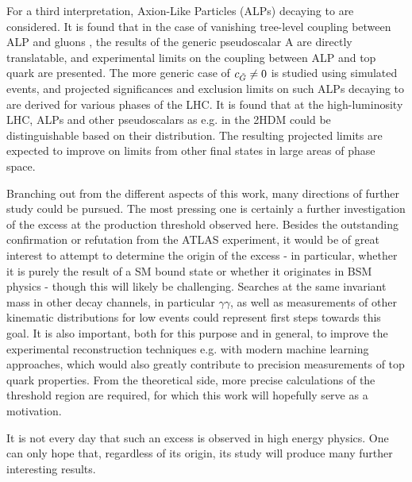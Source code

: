 For a third interpretation, Axion-Like Particles (ALPs) decaying to \ttbar are considered. It is found that in the case of vanishing tree-level coupling between ALP and gluons \cG, the results of the generic pseudoscalar A are directly translatable, and experimental limits on the coupling between ALP and top quark are presented. The more generic case of $c_{\tilde{G}} \neq 0$ is studied using simulated events, and projected significances and exclusion limits on such ALPs decaying to \ttbar are derived for various phases of the LHC. It is found that at the high-luminosity LHC, ALPs and other pseudoscalars as e.g. in the 2HDM could be distinguishable based on their \mtt distribution. The resulting projected limits are expected to improve on limits from other final states in large areas of phase space.

\smallskip

Branching out from the different aspects of this work, many directions of further study could be pursued. The most pressing one is certainly a further investigation of the excess at the \ttbar production threshold observed here. Besides the outstanding confirmation or refutation from the ATLAS experiment, it would be of great interest to attempt to determine the origin of the excess - in particular, whether it is purely the result of a SM bound state or whether it originates in BSM physics - though this will likely be challenging. Searches at the same invariant mass in other decay channels, in particular $\gamma\gamma$, as well as measurements of other kinematic distributions for low \mtt events could represent first steps towards this goal. It is also important, both for this purpose and in general, to improve the experimental \ttbar reconstruction techniques e.g. with modern machine learning approaches, which would also greatly contribute to precision measurements of top quark properties. From the theoretical side, more precise calculations of the \ttbar threshold region are required, for which this work will hopefully serve as a motivation.

It is not every day that such an excess is observed in high energy physics. One can only hope that, regardless of its origin, its study will produce many further interesting results.

